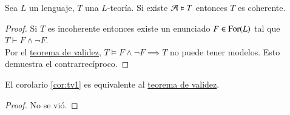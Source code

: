 \begin{cor}\label{cor:tv1}
    Sea $L$ un lenguaje, $T$ una $L$-teoría. Si existe $\mathcal{A} \vDash T$ entonces $T$ es coherente.
\end{cor}

\begin{proof}
    Si $T$ es incoherente entonces existe un enunciado $F \in \mathrm{For}(L)$ tal que $T \vdash F \land \neg F$.\\
    Por el \hyperref[thm:tv]{teorema de validez}, $T \vDash F \land \neg F \implies T$ no puede tener modelos. Esto demuestra el contrarrecíproco.
\end{proof}

\begin{cor}\label{cor:tv2}
    El corolario \ref{cor:tv1} es equivalente al \hyperref[thm:tv]{teorema de validez}.
\end{cor}

\begin{proof}
    No se vió.
\end{proof}
